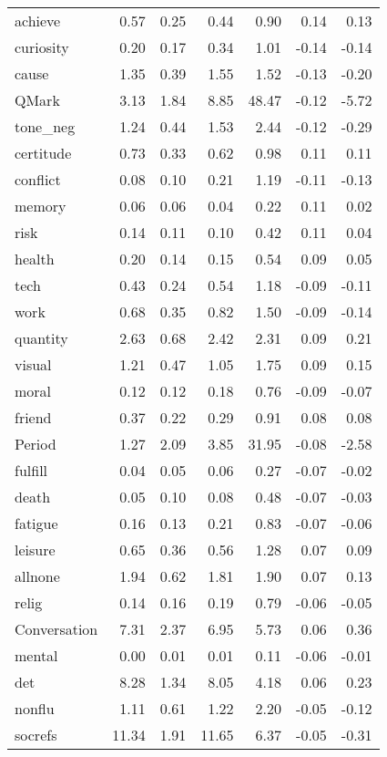 \begin{longtable}{@{}p{3.4cm}rrrrrr@{}}
achieve & 0.57 & 0.25 & 0.44 & 0.90 & 0.14 & 0.13 \\
curiosity & 0.20 & 0.17 & 0.34 & 1.01 & -0.14 & -0.14 \\
cause & 1.35 & 0.39 & 1.55 & 1.52 & -0.13 & -0.20 \\
QMark & 3.13 & 1.84 & 8.85 & 48.47 & -0.12 & -5.72 \\
tone\_neg & 1.24 & 0.44 & 1.53 & 2.44 & -0.12 & -0.29 \\
certitude & 0.73 & 0.33 & 0.62 & 0.98 & 0.11 & 0.11 \\
conflict & 0.08 & 0.10 & 0.21 & 1.19 & -0.11 & -0.13 \\
memory & 0.06 & 0.06 & 0.04 & 0.22 & 0.11 & 0.02 \\
risk & 0.14 & 0.11 & 0.10 & 0.42 & 0.11 & 0.04 \\
health & 0.20 & 0.14 & 0.15 & 0.54 & 0.09 & 0.05 \\
tech & 0.43 & 0.24 & 0.54 & 1.18 & -0.09 & -0.11 \\
work & 0.68 & 0.35 & 0.82 & 1.50 & -0.09 & -0.14 \\
quantity & 2.63 & 0.68 & 2.42 & 2.31 & 0.09 & 0.21 \\
visual & 1.21 & 0.47 & 1.05 & 1.75 & 0.09 & 0.15 \\
moral & 0.12 & 0.12 & 0.18 & 0.76 & -0.09 & -0.07 \\
friend & 0.37 & 0.22 & 0.29 & 0.91 & 0.08 & 0.08 \\
Period & 1.27 & 2.09 & 3.85 & 31.95 & -0.08 & -2.58 \\
fulfill & 0.04 & 0.05 & 0.06 & 0.27 & -0.07 & -0.02 \\
death & 0.05 & 0.10 & 0.08 & 0.48 & -0.07 & -0.03 \\
fatigue & 0.16 & 0.13 & 0.21 & 0.83 & -0.07 & -0.06 \\
leisure & 0.65 & 0.36 & 0.56 & 1.28 & 0.07 & 0.09 \\
allnone & 1.94 & 0.62 & 1.81 & 1.90 & 0.07 & 0.13 \\
relig & 0.14 & 0.16 & 0.19 & 0.79 & -0.06 & -0.05 \\
Conversation & 7.31 & 2.37 & 6.95 & 5.73 & 0.06 & 0.36 \\
mental & 0.00 & 0.01 & 0.01 & 0.11 & -0.06 & -0.01 \\
det & 8.28 & 1.34 & 8.05 & 4.18 & 0.06 & 0.23 \\
nonflu & 1.11 & 0.61 & 1.22 & 2.20 & -0.05 & -0.12 \\
socrefs & 11.34 & 1.91 & 11.65 & 6.37 & -0.05 & -0.31 \\

\end{longtable}
